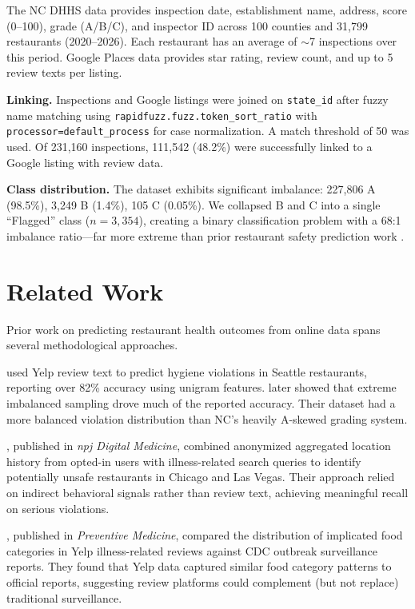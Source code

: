 \documentclass{article}
\begin{document}
The NC DHHS data provides inspection date, establishment name, address, score (0--100), grade (A/B/C), and inspector ID across 100 counties and 31,799 restaurants (2020--2026). Each restaurant has an average of $\sim$7 inspections over this period. Google Places data provides star rating, review count, and up to 5 review texts per listing.

\textbf{Linking.} Inspections and Google listings were joined on \texttt{state\_id} after fuzzy name matching using \texttt{rapidfuzz.fuzz.token\_sort\_ratio} with \texttt{processor=default\_process} for case normalization. A match threshold of 50 was used. Of 231,160 inspections, 111,542 (48.2\%) were successfully linked to a Google listing with review data.

\textbf{Class distribution.} The dataset exhibits significant imbalance: 227,806 A (98.5\%), 3,249 B (1.4\%), 105 C (0.05\%). We collapsed B and C into a single ``Flagged'' class ($n=3{,}354$), creating a binary classification problem with a 68:1 imbalance ratio---far more extreme than prior restaurant safety prediction work \citep{kang2013using}.

\section{Related Work}

Prior work on predicting restaurant health outcomes from online data spans several methodological approaches.

\citet{kang2013using} used Yelp review text to predict hygiene violations in Seattle restaurants, reporting over 82\% accuracy using unigram features. \citet{altenburger2019predicting} later showed that extreme imbalanced sampling drove much of the reported accuracy. Their dataset had a more balanced violation distribution than NC's heavily A-skewed grading system.

\citet{sadilek2018machine}, published in \textit{npj Digital Medicine}, combined anonymized aggregated location history from opted-in users with illness-related search queries to identify potentially unsafe restaurants in Chicago and Las Vegas. Their approach relied on indirect behavioral signals rather than review text, achieving meaningful recall on serious violations.

\citet{nsoesie2014online}, published in \textit{Preventive Medicine}, compared the distribution of implicated food categories in Yelp illness-related reviews against CDC outbreak surveillance reports. They found that Yelp data captured similar food category patterns to official reports, suggesting review platforms could complement (but not replace) traditional surveillance.
\end{document}
